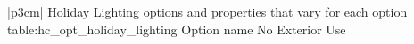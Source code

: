 \begin{customLongTable}{ |p{3cm}| }
{Holiday Lighting options and properties that vary for each option} {table:hc_opt_holiday_lighting}
{Option name}
No Exterior Use \\
\end{customLongTable}
